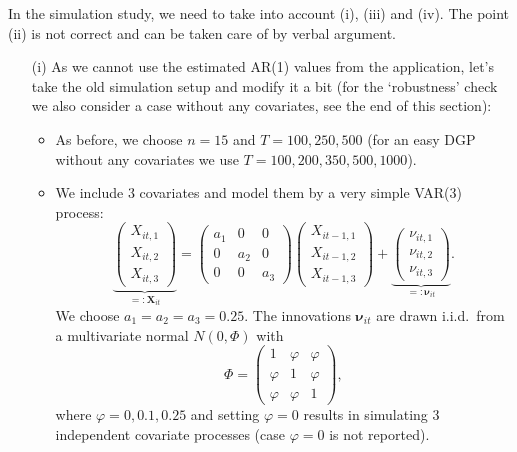 \documentclass[a4paper,12pt]{article}
\begin{document}
\begin{enumerate}[label=\arabic*.,leftmargin=0.6cm]
{\color{blue}  
In the simulation study, we need to take into account (i), (iii) and (iv). The point (ii) is not correct and can be taken care of by verbal argument.
\begin{itemize}[topsep=0pt]
 
\item[(i)] As we cannot use the estimated AR(1) values from the application, let's take the old simulation setup and modify it a bit {\color{red} (for the `robustness' check we also consider a case without any covariates, see the end of this section)}: 

\begin{itemize}[label=--,leftmargin=0.45cm,itemsep=0pt]

\item As before, we choose $n=15$ and $T=100,250,500$ {\color{red} (for an easy DGP without any covariates we use $T=100,200, 350, 500, 1000$)}.
  
\item We include $3$ covariates and model them by a very simple VAR(3) process:
\[ \underbrace{\begin{pmatrix} X_{it,1} \\ X_{it,2} \\ X_{it,3} \end{pmatrix}}_{=: \boldsymbol{X}_{it}} = \begin{pmatrix} a_1 & 0 & 0 \\ 0 & a_2 & 0 \\ 0 & 0 & a_3 \end{pmatrix} \begin{pmatrix} X_{it-1,1} \\ X_{it-1,2} \\ X_{it-1,3} \end{pmatrix} + \underbrace{\begin{pmatrix} \nu_{it,1} \\ \nu_{it,2} \\ \nu_{it,3} \end{pmatrix}}_{=: \boldsymbol{\nu}_{it}}. \] 
We choose {\color{red} $a_1 = a_2 = a_3 = 0.25$}. The innovations $\boldsymbol{\nu}_{it}$ are drawn i.i.d.\ from a multivariate normal $N(0,\Phi)$ with
\[ \Phi = \begin{pmatrix} 1 & \varphi & \varphi \\ \varphi & 1 & \varphi \\ \varphi & \varphi & 1 \end{pmatrix}, \]
where $\varphi=0, 0.1, 0.25$ and setting $\varphi = 0$ results in simulating 3 independent covariate processes {\color{red}(case $\varphi = 0$ is not reported)}. 


\end{itemize}
\end{itemize}}
\end{enumerate}
\end{document}
